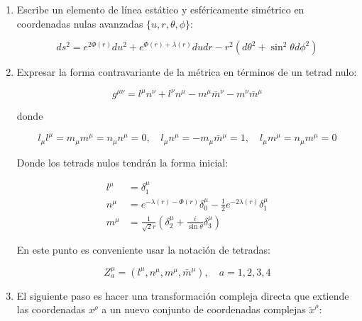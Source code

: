 \begin{enumerate}[1.]
    \item Escribe un elemento de línea estático y esféricamente simétrico en coordenadas nulas avanzadas $\{u, r, \theta, \phi\}$:

          \begin{equation}
              ds^2 = e^{2 \Phi(r)} du^2 + e^{\Phi(r) + \lambda(r)} du dr - r^2 (d\theta^2 + \sin^2 \theta d\phi^2)
          \end{equation}

    \item Expresar la forma contravariante de la métrica en términos de un tetrad nulo:

          \begin{equation}
              g^{\mu \nu} = l^\mu n^\nu + l^\nu n^\mu - m^\mu \bar{m}^\nu - m^\nu \bar{m}^\mu
          \end{equation}

          donde

          \begin{equation}
              l_\mu l^\mu = m_\mu m^\mu = n_\mu n^\mu = 0, \quad l_\mu n^\mu = -m_\mu \bar{m}^\mu = 1, \quad l_\mu m^\mu = n_\mu m^\mu = 0
          \end{equation}

          Donde los tetrads nulos tendrán la forma inicial:

          \begin{equation}
              \begin{aligned}
                  l^\mu & = \delta_1^\mu                                                                          \\
                  n^\mu & = e^{-\lambda(r) - \Phi(r)} \delta_0^\mu - \frac{1}{2} e^{-2 \lambda(r)} \delta_1^\mu   \\
                  m^\mu & = \frac{1}{\sqrt{2} r} \left( \delta_2^\mu + \frac{i}{\sin \theta} \delta_3^\mu \right)
              \end{aligned}
          \end{equation}

          En este punto es conveniente usar la notación de tetradas:

          \begin{equation}
              Z_a^\mu = (l^\mu, n^\mu, m^\mu, \bar{m}^\mu), \quad a = 1, 2, 3, 4
          \end{equation}

    \item El siguiente paso es hacer una transformación compleja directa que extiende las coordenadas $x^\rho$ a un nuevo conjunto de coordenadas complejas $\tilde{x}^\rho$:


\end{enumerate}
